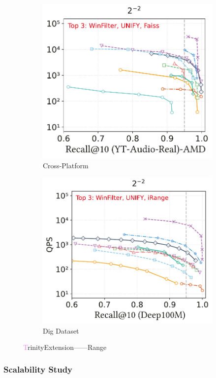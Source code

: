 \documentclass[sigconf, nonacm]{acmart}
\begin{document}
\begin{figure}[t]
\begin{subfigure}[b]{0.39\textwidth}
		\hfill
		\includegraphics[width=0.47\linewidth]{figures/exp/range_71.pdf}
		\caption{Cross-Platform}
		\label{fig:range-cross-platform}
	\end{subfigure}
	\hfill %
	\begin{subfigure}[b]{0.203\textwidth}
		\centering
		\includegraphics[width=0.96\linewidth]{figures/exp/range_deep100M.pdf} 
		\caption{Dig Dataset}
		\label{fig: range big dataset}
	\end{subfigure}
	
	\caption{\textcolor{violet}TrinityExtension——Range}
	\label{fig:TrinityExtension——Attribution_main}
\end{figure}
	
	\subsubsection{Scalability Study}
		
\end{document}
